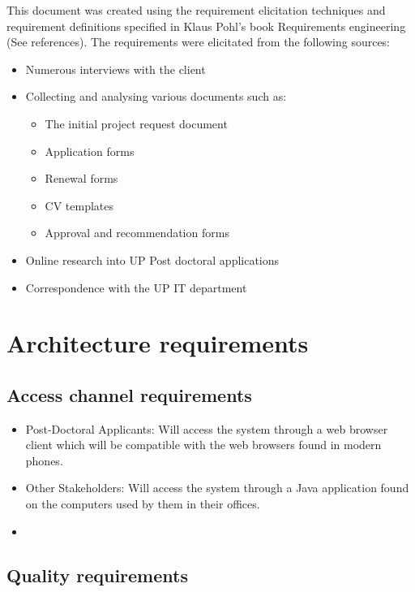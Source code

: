\documentclass[12pt]{article}
\begin{document}
	This document was created using the requirement elicitation techniques and requirement definitions specified in Klaus Pohl’s book Requirements engineering (See references).
	The requirements were elicitated from the following sources:
	\begin{itemize}
		\item Numerous interviews with the client
		\item Collecting and analysing various documents such as:
		\begin{itemize}
			\item The initial project request document
			\item Application forms
			\item Renewal forms
			\item CV templates
			\item Approval and recommendation forms			 
		\end{itemize}		
		\item Online research into UP Post doctoral applications
		\item Correspondence with the UP IT department
	\end{itemize}	
	
	\vspace{0.5in}
	
	\newpage
	\section{Architecture requirements}
		\subsection{Access channel requirements} %
		\vspace{0.2in}
		\begin{itemize}
		\item Post-Doctoral Applicants: Will access the system through a web browser client which will be compatible with the web browsers found in modern phones. 
		\item Other Stakeholders: Will access the system through a Java application found on the computers used by them in their offices.
		\item %
		\end{itemize}

		\vspace{0.2in}
		
		\subsection{Quality requirements} %
		\vspace{0.2in}
		
\end{document}

